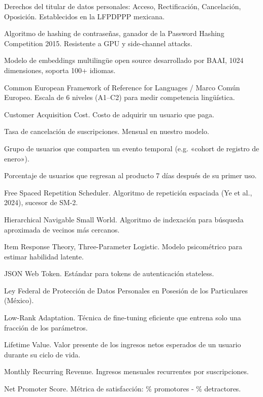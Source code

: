\documentclass[10pt,a4paper,oneside]{report}
\begin{document}
\begin{description}[leftmargin=1.4em,itemsep=2pt]
\item[ARCO] Derechos del titular de datos personales: Acceso, Rectificación, Cancelación, Oposición. Establecidos en la LFPDPPP mexicana.
\item[Argon2id] Algoritmo de hashing de contraseñas, ganador de la Password Hashing Competition 2015. Resistente a GPU y side-channel attacks.
\item[BGE-M3] Modelo de embeddings multilingüe open source desarrollado por BAAI, 1024 dimensiones, soporta 100+ idiomas.
\item[CEFR / MCER] Common European Framework of Reference for Languages / Marco Común Europeo. Escala de 6 niveles (A1--C2) para medir competencia lingüística.
\item[CAC] Customer Acquisition Cost. Costo de adquirir un usuario que paga.
\item[Churn] Tasa de cancelación de suscripciones. Mensual en nuestro modelo.
\item[Cohort] Grupo de usuarios que comparten un evento temporal (e.g. «cohort de registro de enero»).
\item[D7 retention] Porcentaje de usuarios que regresan al producto 7 días después de su primer uso.
\item[FSRS] Free Spaced Repetition Scheduler. Algoritmo de repetición espaciada (Ye et al., 2024), sucesor de SM-2.
\item[HNSW] Hierarchical Navigable Small World. Algoritmo de indexación para búsqueda aproximada de vecinos más cercanos.
\item[IRT 3PL] Item Response Theory, Three-Parameter Logistic. Modelo psicométrico para estimar habilidad latente.
\item[JWT] JSON Web Token. Estándar para tokens de autenticación stateless.
\item[LFPDPPP] Ley Federal de Protección de Datos Personales en Posesión de los Particulares (México).
\item[LoRA] Low-Rank Adaptation. Técnica de fine-tuning eficiente que entrena solo una fracción de los parámetros.
\item[LTV] Lifetime Value. Valor presente de los ingresos netos esperados de un usuario durante su ciclo de vida.
\item[MRR] Monthly Recurring Revenue. Ingresos mensuales recurrentes por suscripciones.
\item[NPS] Net Promoter Score. Métrica de satisfacción: \% promotores - \% detractores.

\end{description}
\end{document}

